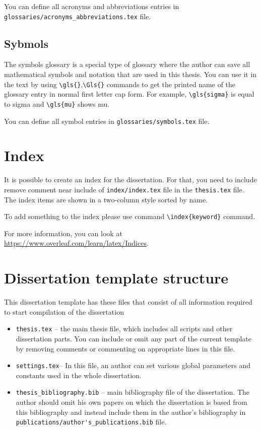 You can define all acronyms and abbreviations entries in \\
\verb|glossaries/acronyms_abbreviations.tex| file.


\subsection{Sybmols}
\label{subsec:Sybmols}

The symbols glossary  is a special type of glossary where the author can save all mathematical symbols and notation that are used in this thesis.  You can use it in the text by using \verb|\gls{}|,\verb|\Gls{}| commands to get the printed name of the glossary entry in normal first letter cap form. For example, \verb|\gls{sigma}| is equal to \gls{sigma} and \verb|\gls{mu}| shows \gls{mu}.

You can define all symbol entries in \verb|glossaries/symbols.tex| file.

\section{Index}
\label{sec:Index}

It is possible to create an index for the dissertation. For that, you need to include remove comment near include of \verb|index/index.tex| file in the \verb|thesis.tex| file.
The index items are shown in a two-column style sorted by name.

To add something to the index please use command \verb|\index{keyword}| command.

For more information, you can look at \url{https://www.overleaf.com/learn/latex/Indices}.


\section{Dissertation template structure}
\label{sec:template_structure}

This dissertation template has these files that consist of all information required to start compilation of the dissertation
\begin{itemize}
    \item \verb|thesis.tex| -- the main thesis file, which includes all scripts and other dissertation parts. You can include or omit any part of the current template by removing comments or commenting on appropriate lines in this file.
    \item \verb|settings.tex|-- In this file, an author can set various global parameters and constants used in the whole dissertation.
    \item \verb|thesis_bibliography.bib| -- main bibliography file of the dissertation. The author should omit his own papers on which the dissertation is based from this bibliography and instead include them in the author's bibliography in\\
    \verb|publications/author's_publications.bib| file.
\end{itemize}


